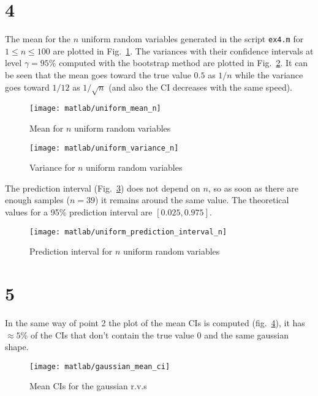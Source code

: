 \documentclass{article}
\newcommand{\inlinecode}[1]{\lstinline[basicstyle=\ttfamily,keywordstyle={}]{#1}}
\begin{document}
\section*{4} The mean for the $n$ uniform random variables generated in the
script \inlinecode{ex4.m} for $ 1 \leq n \leq 100 $ are plotted in
Fig.~\ref{uniform_mean}. The variances with their confidence
intervals at level $\gamma = 95\%$ computed with the bootstrap
method are plotted in Fig.~\ref{uniform_var}. It can be seen that
the mean goes toward the true value $0.5$ as $1/n$ while the
variance goes toward $1/12$ as $1/\sqrt{n}$ (and also the CI
decreases with the same speed).
\begin{figure}[htbp]
  \centering
  \texttt{[image: matlab/uniform\_mean\_n]}
  \caption{Mean for $n$ uniform random variables}
  \label{uniform_mean}
\end{figure}
\begin{figure}[htbp]
  \centering
  \texttt{[image: matlab/uniform\_variance\_n]}
  \caption{Variance for $n$ uniform random variables}
  \label{uniform_var}
\end{figure}
The prediction interval (Fig.~\ref{pred_int_unif}) does not depend
on $n$, so as soon as there are enough samples ($n=39$) it remains
around the same value. The theoretical values for a 95\% prediction
interval are $[0.025, 0.975]$.
\begin{figure}[htbp]
  \centering
  \texttt{[image: matlab/uniform\_prediction\_interval\_n]}
  \caption{Prediction interval for $n$ uniform random variables}
  \label{pred_int_unif}
\end{figure}
\section*{5} In the same way of point 2 the plot of the mean CIs is computed
(fig.~\ref{gaussian_mean_ci}), it has $\approx 5\%$ of the CIs that
don't contain the true value 0 and the same gaussian shape.
\begin{figure}[htbp]
  \centering
  \texttt{[image: matlab/gaussian\_mean\_ci]}
  \caption{Mean CIs for the gaussian r.v.s}
  \label{gaussian_mean_ci}
\end{figure}
\end{document}
